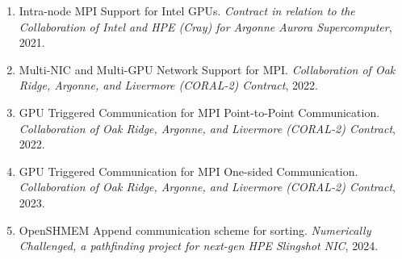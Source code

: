 \begin{enumerate}
\setcounter{enumi}{0}
\item Intra-node MPI Support for Intel GPUs. \textit{Contract in relation to the
      Collaboration of Intel and HPE (Cray) for Argonne Aurora Supercomputer}, 2021.
\item Multi-NIC and Multi-GPU Network Support for MPI. \textit{Collaboration of
      Oak Ridge, Argonne, and Livermore (CORAL-2) Contract}, 2022.
\item GPU Triggered Communication for MPI Point-to-Point Communication.
      \textit{Collaboration of Oak Ridge, Argonne, and Livermore (CORAL-2)
      Contract}, 2022.
\item GPU Triggered Communication for MPI One-sided Communication.
      \textit{Collaboration of Oak Ridge, Argonne, and Livermore
      (CORAL-2) Contract}, 2023.
\item OpenSHMEM Append communication scheme for sorting. \textit{Numerically
      Challenged, a pathfinding project for next-gen HPE Slingshot NIC}, 2024.
\end{enumerate}

